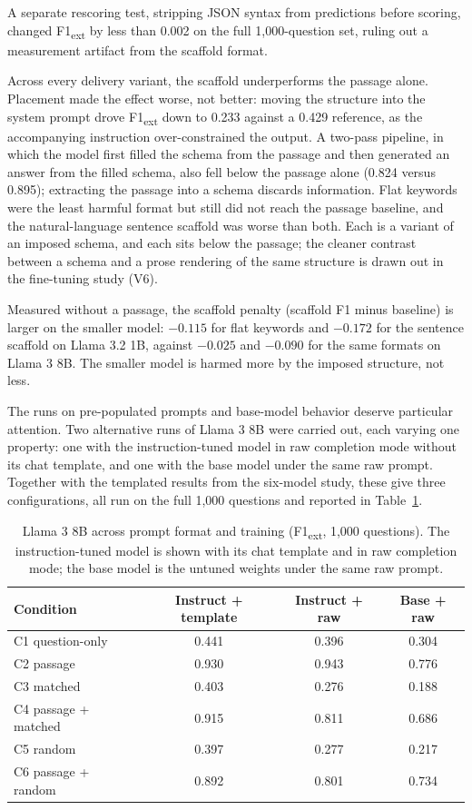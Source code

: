 \documentclass{article}
\begin{document}
A separate rescoring test, stripping JSON syntax from predictions before scoring, changed F1\textsubscript{ext} by less than 0.002 on the full 1,000-question set, ruling out a measurement artifact from the scaffold format.

Across every delivery variant, the scaffold underperforms the passage alone. Placement made the effect worse, not better: moving the structure into the system prompt drove F1\textsubscript{ext} down to 0.233 against a 0.429 reference, as the accompanying instruction over-constrained the output. A two-pass pipeline, in which the model first filled the schema from the passage and then generated an answer from the filled schema, also fell below the passage alone (0.824 versus 0.895); extracting the passage into a schema discards information. Flat keywords were the least harmful format but still did not reach the passage baseline, and the natural-language sentence scaffold was worse than both. Each is a variant of an imposed schema, and each sits below the passage; the cleaner contrast between a schema and a prose rendering of the same structure is drawn out in the fine-tuning study (V6).

Measured without a passage, the scaffold penalty (scaffold F1 minus baseline) is larger on the smaller model: $-0.115$ for flat keywords and $-0.172$ for the sentence scaffold on Llama 3.2 1B, against $-0.025$ and $-0.090$ for the same formats on Llama 3 8B. The smaller model is harmed more by the imposed structure, not less.

The runs on pre-populated prompts and base-model behavior deserve particular attention. Two alternative runs of Llama 3 8B were carried out, each varying one property: one with the instruction-tuned model in raw completion mode without its chat template, and one with the base model under the same raw prompt. Together with the templated results from the six-model study, these give three configurations, all run on the full 1,000 questions and reported in Table~\ref{tab:rawtuning}.

\begin{table}[h]
\centering
\begin{tabular}{lccc}
\toprule
Condition & Instruct + template & Instruct + raw & Base + raw \\
\midrule
C1 question-only    & 0.441 & 0.396 & 0.304 \\
C2 passage          & 0.930 & 0.943 & 0.776 \\
C3 matched          & 0.403 & 0.276 & 0.188 \\
C4 passage + matched & 0.915 & 0.811 & 0.686 \\
C5 random           & 0.397 & 0.277 & 0.217 \\
C6 passage + random & 0.892 & 0.801 & 0.734 \\
\bottomrule
\end{tabular}
\caption{Llama 3 8B across prompt format and training (F1\textsubscript{ext}, 1,000 questions). The instruction-tuned model is shown with its chat template and in raw completion mode; the base model is the untuned weights under the same raw prompt.}
\label{tab:rawtuning}
\end{table}
\end{document}
